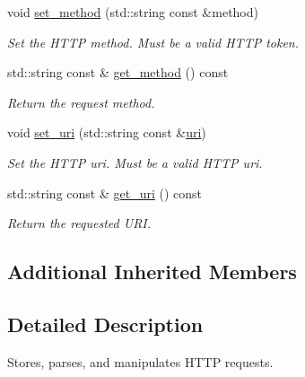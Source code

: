 \begin{DoxyCompactItemize}
void \mbox{\hyperlink{classwebsocketpp_1_1http_1_1parser_1_1request_af1f0c6944c6cbbaf6db20e5830333eaf}{set\+\_\+method}} (std\+::string const \&method)
\begin{DoxyCompactList}\small\item\em Set the H\+T\+TP method. Must be a valid H\+T\+TP token. \end{DoxyCompactList}\item 
\mbox{\label{classwebsocketpp_1_1http_1_1parser_1_1request_a756f90f92127c7a16b0fa52322bbdfda}} 
std\+::string const  \& \mbox{\hyperlink{classwebsocketpp_1_1http_1_1parser_1_1request_a756f90f92127c7a16b0fa52322bbdfda}{get\+\_\+method}} () const
\begin{DoxyCompactList}\small\item\em Return the request method. \end{DoxyCompactList}\item 
\mbox{\label{classwebsocketpp_1_1http_1_1parser_1_1request_ac4dcfa00f2112ee33b571f1754f9d893}} 
void \mbox{\hyperlink{classwebsocketpp_1_1http_1_1parser_1_1request_ac4dcfa00f2112ee33b571f1754f9d893}{set\+\_\+uri}} (std\+::string const \&\mbox{\hyperlink{classwebsocketpp_1_1uri}{uri}})
\begin{DoxyCompactList}\small\item\em Set the H\+T\+TP uri. Must be a valid H\+T\+TP uri. \end{DoxyCompactList}\item 
\mbox{\label{classwebsocketpp_1_1http_1_1parser_1_1request_aac99dca40df93826deca4c8be789847e}} 
std\+::string const  \& \mbox{\hyperlink{classwebsocketpp_1_1http_1_1parser_1_1request_aac99dca40df93826deca4c8be789847e}{get\+\_\+uri}} () const
\begin{DoxyCompactList}\small\item\em Return the requested U\+RI. \end{DoxyCompactList}\end{DoxyCompactItemize}
\subsection*{Additional Inherited Members}


\subsection{Detailed Description}
Stores, parses, and manipulates H\+T\+TP requests. 


